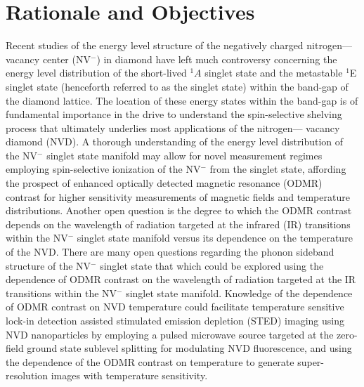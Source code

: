 \section{Rationale and Objectives}
Recent studies of the energy level structure of the negatively charged nitrogen—vacancy center (NV$^-$) in diamond have 
left much controversy concerning the energy level distribution of the short-lived $^1A$ singlet state and the metastable $^1$E singlet state (henceforth referred to as the singlet state) within the band-gap 
of the diamond lattice.  The location of these energy states within the band-gap is of fundamental importance in the 
drive to understand the spin-selective shelving process that ultimately underlies most applications of the nitrogen—
vacancy diamond (NVD).  A thorough understanding of the energy level distribution of the NV$^-$ singlet state manifold may 
allow for novel measurement regimes employing spin-selective ionization of the NV$^-$ from the singlet state, affording 
the prospect of enhanced optically detected magnetic resonance (ODMR) contrast for higher sensitivity measurements 
of magnetic fields and temperature distributions.  Another open question is the degree to which the ODMR contrast 
depends on the wavelength of radiation targeted at the infrared (IR) transitions within the NV$^-$ singlet state 
manifold versus its dependence on the temperature of the NVD.   There are many open questions regarding the phonon 
sideband structure of the NV$^-$ singlet state that which could be explored using the dependence of ODMR contrast on 
the wavelength of radiation targeted at the IR transitions within the NV$^-$ singlet state manifold.  Knowledge of the 
dependence of ODMR contrast on NVD temperature could facilitate temperature sensitive lock-in detection assisted stimulated emission depletion (STED) imaging using NVD nanoparticles by employing a pulsed microwave source 
targeted at the zero-field ground state sublevel splitting for modulating NVD fluorescence, and using the dependence of the ODMR contrast on temperature to generate super-resolution images with temperature sensitivity.

